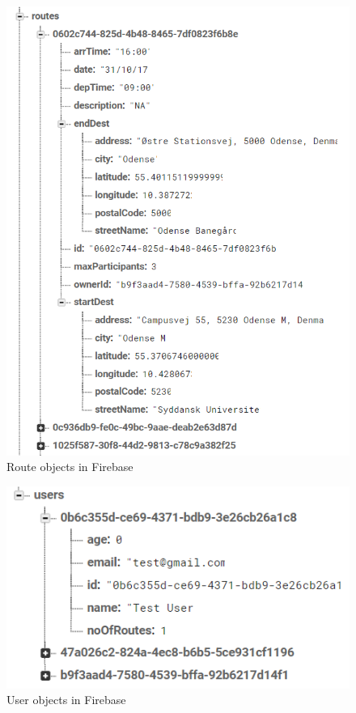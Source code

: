 \label{app:firebase_figures}
\begin{figure}[H]
    \centering
    \includegraphics[scale=1.5]{Graphics/Images/firebase_routes.PNG}
    \caption{Route objects in Firebase}
    \label{fig:firebase_routes_appendix}
\end{figure}

\begin{figure}[H]
    \centering
    \includegraphics[scale=1.5]{Graphics/Images/firebase_users.PNG}
    \caption{User objects in Firebase}
    \label{fig:firebase_users_appendix}
\end{figure}


